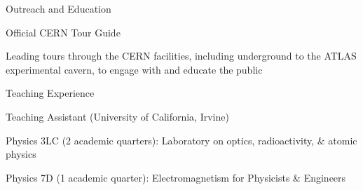 {\Large Outreach and Education} \\
\HRule

\hspace{0.25in}
\begin{minipage}{0.8\textwidth}
	\vspace{0.15in}
	Official CERN Tour Guide

	\hspace{0.15in}
	\begin{minipage}{1.0\textwidth}
		\vspace{0.15in}

		Leading tours through the CERN facilities, including underground to the ATLAS experimental cavern, to engage with and educate the public
	\end{minipage}
\end{minipage}

\vspace{0.2in}
{\Large Teaching Experience}\\
\HRule

\hspace{0.25in}
\begin{minipage}{0.8\textwidth}
	\vspace{0.15in}
	Teaching Assistant (University of California, Irvine)

	\hspace{0.15in}
	\begin{minipage}{1.0\textwidth}
		\vspace{0.1in}
		Physics 3LC (2 academic quarters): Laboratory on optics, radioactivity, \& atomic physics

		\vspace{0.1in}
		Physics 7D (1 academic quarter): Electromagnetism for Physicists \& Engineers
	\end{minipage}
\end{minipage}
